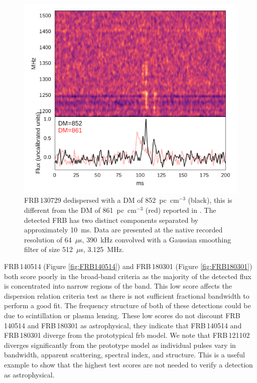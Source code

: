 \documentclass[a4paper,fleqn,usenatbib]{mnras}
\begin{document}
\begin{figure}
    \includegraphics[width=1.0\linewidth]{figures/FRB130729.pdf}
    \caption{FRB\,130729 dedispersed with a DM of 852~pc~cm$^{-3}$ (black), this
    is different from the DM of 861~pc~cm$^{-3}$ (red) reported in
    \protect\cite{2016MNRAS.460L..30C}.  The detected FRB has two distinct
    components separated by approximately 10~ms. Data are presented at the native
    recorded resolution of 64~$\mu$s, 390~kHz convolved with a Gaussian
    smoothing filter of size 512~$\mu$s, 3.125~MHz.}
    \label{fig:FRB130729}
\end{figure}

FRB\,140514 (Figure \ref{fig:FRB140514}) and FRB\,180301 (Figure
\ref{fig:FRB180301}) both score poorly in the broad-band criteria as the
majority of the detected flux is concentrated into narrow regions of the band.
This low score affects the dispersion relation criteria test as there is not
sufficient fractional bandwidth to perform a good fit. The frequency structure
of both of these detections could be due to scintillation or plasma lensing.
These low scores do not discount FRB\,140514 and FRB\,180301 as astrophysical, they
indicate that FRB\,140514 and FRB\,180301 diverge from the prototypical \gls{frb}
model.  We note that FRB\,121102 diverges significantly from the prototype model
as individual pulses vary in bandwidth, apparent scattering, spectral index, and
structure.  This is a useful example to show that the highest test scores are
not needed to verify a detection as astrophysical.
\end{document}
